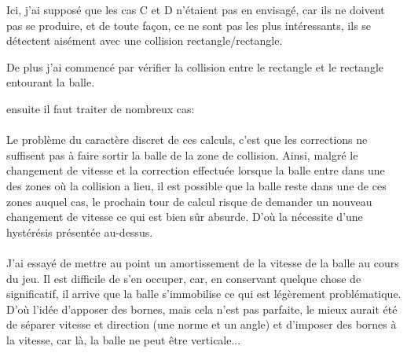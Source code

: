 \documentclass[a4paper,12pt]{report}
\begin{document}
Ici, j'ai supposé que les cas C et D n'étaient pas en envisagé, car ils ne doivent pas se produire, et de toute façon, ce ne sont pas les plus intéressants, ils se détectent aisément avec une collision rectangle/rectangle.

De plus j'ai commencé par vérifier la collision entre le rectangle et le rectangle entourant la balle.




ensuite il faut traiter de nombreux cas:






\paragraph{}

Le problème du caractère discret de ces calculs, c'est que les corrections ne suffisent pas à faire sortir la balle de la zone de collision. Ainsi, malgré le changement de vitesse et la correction effectuée lorsque la balle entre dans une des zones où la collision a lieu, il est possible que la balle reste dans une de ces zones auquel cas, le prochain tour de calcul risque de demander un nouveau changement de vitesse ce qui est bien sûr absurde. D'où la nécessite d'une hystérésis présentée au-dessus.

\paragraph{}

J'ai essayé de mettre au point un amortissement de la vitesse de la balle au cours du jeu. Il est difficile de s'en occuper, car, en conservant quelque chose de significatif, il arrive que la balle s'immobilise ce qui est légèrement problématique. D'où l'idée d'apposer des bornes, mais cela n'est pas parfaite, le mieux aurait été de séparer vitesse et direction (une norme et un angle) et d'imposer des bornes à la vitesse, car là, la balle ne peut être verticale...

\lstset{language=Java}
\end{document}
